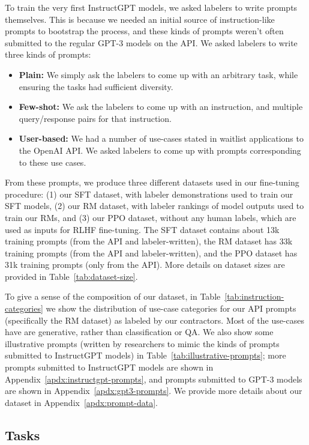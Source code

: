To train the very first InstructGPT models, we asked labelers to write prompts themselves. This is because we needed an initial source of instruction-like prompts to bootstrap the process, and these kinds of prompts weren't often submitted to the regular GPT-3 models on the API. We asked labelers to write three kinds of prompts:

\begin{itemize}
    \item \textbf{Plain:}  We simply ask the labelers to come up with an arbitrary task, while ensuring the tasks had sufficient diversity.
\item \textbf{Few-shot:}  We ask the labelers to come up with an instruction, and multiple query/response pairs for that instruction.  
\item \textbf{User-based:}  We had a number of use-cases stated in waitlist applications to the OpenAI API.  We asked labelers to come up with prompts corresponding to these use cases. 
\end{itemize}

From these prompts, we produce three different datasets used in our fine-tuning procedure: (1) our SFT dataset, with labeler demonstrations used to train our SFT models, (2) our RM dataset, with labeler rankings of model outputs used to train our RMs, and (3) our PPO dataset, without any human labels, which are used as inputs for RLHF fine-tuning. The SFT dataset contains about 13k training prompts (from the API and labeler-written), the RM dataset has 33k training prompts (from the API and labeler-written), and the PPO dataset has 31k training prompts (only from the API). More details on dataset sizes are provided in Table~\ref{tab:dataset-size}. 

To give a sense of the composition of our dataset, in Table~\ref{tab:instruction-categories} we show the distribution of use-case categories for our API prompts (specifically the RM dataset) as labeled by our contractors. Most of the use-cases have are generative, rather than classification or QA. We also show some illustrative prompts (written by researchers to mimic the kinds of prompts submitted to InstructGPT models) in Table~\ref{tab:illustrative-prompts}; more prompts submitted to InstructGPT models are shown in Appendix~\ref{apdx:instructgpt-prompts}, and prompts submitted to GPT-3 models are shown in Appendix~\ref{apdx:gpt3-prompts}.
We provide more details about our dataset in Appendix~\ref{apdx:prompt-data}.

\subsection{Tasks}
\label{sec:task}

